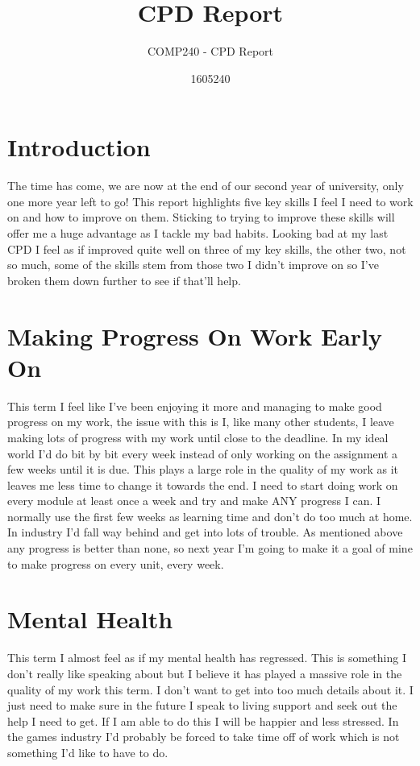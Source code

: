 \documentclass{scrartcl}
\title{CPD Report}
\subtitle{COMP240 - CPD Report}
\author{1605240}
\begin{document}
\maketitle

\section*{Introduction}
The time has come, we are now at the end of our second year of university, only one more year left to go! This report highlights five key skills I feel I need to work on and how to improve on them. Sticking to trying to improve these skills will offer me a huge advantage as I tackle my bad habits. Looking bad at my last CPD I feel as if improved quite well on three of my key skills, the other two, not so much, some of the skills stem from those two I didn't improve on so I've broken them down further to see if that'll help.

\section{Making Progress On Work Early On}
This term I feel like I've been enjoying it more and managing to make good progress on my work, the issue with this is I, like many other students, I leave making lots of progress with my work until close to the deadline. In my ideal world I'd do bit by bit every week instead of only working on the assignment a few weeks until it is due. This plays a large role in the quality of my work as it leaves me less time to change it towards the end. I need to start doing work on every module at least once a week and try and make ANY progress I can. I normally use the first few weeks as learning time and don't do too much at home. In industry I'd fall way behind and get into lots of trouble. As mentioned above any progress is better than none, so next year I'm going to make it a goal of mine to make progress on every unit, every week.


\section{Mental Health}
This term I almost feel as if my mental health has regressed. This is something I don't really like speaking about but I believe it has played a massive role in the quality of my work this term. I don't want to get into too much details about it. I just need to make sure in the future I speak to living support and seek out the help I need to get. If I am able to do this I will be happier and less stressed. In the games industry I'd probably be forced to take time off of work which is not something I'd like to have to do.
\end{document}
